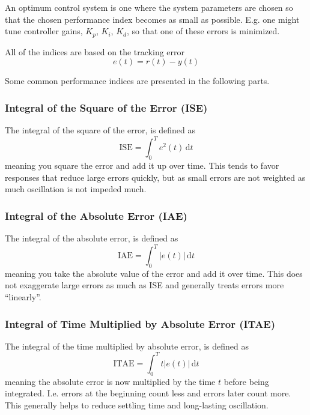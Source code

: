 An optimum control system is one where the system parameters are chosen so that the chosen performance index becomes as small as possible.
E.g. one might tune controller gains, $K_p$, $K_i$, $K_d$, so that one of these errors is minimized.

All of the indices are based on the tracking error
\begin{equation*}
  e(t) = r(t) - y(t)
\end{equation*}

Some common performance indices are presented in the following parts.

\subsubsection{Integral of the Square of the Error (ISE)}
The integral of the square of the error, is defined as
\begin{equation*}
  \mathrm{ISE} = \int_{0}^{T} e^2(t) \, \mathrm{d}t 
\end{equation*}
meaning you square the error and add it up over time.
This tends to favor responses that reduce large errors quickly, but as small errors are not weighted as much oscillation is not impeded much.

\subsubsection{Integral of the Absolute Error (IAE)}
The integral of the absolute error, is defined as
\begin{equation*}
  \mathrm{IAE} = \int_{0}^{T} \left| e(t) \right|\, \mathrm{d}t 
\end{equation*}
meaning you take the absolute value of the error and add it over time.
This does not exaggerate large errors as much as ISE and generally treats errors more ``linearly''.

\subsubsection{Integral of Time Multiplied by Absolute Error (ITAE)}
The integral of the time multiplied by absolute error, is defined as
\begin{equation*}
  \mathrm{ITAE} = \int_{0}^{T} t \left| e(t) \right| \, \mathrm{d}t 
\end{equation*}
meaning the absolute error is now multiplied by the time $t$ before being integrated.
I.e. errors at the beginning count less and errors later count more.
This generally helps to reduce settling time and long-lasting oscillation.

